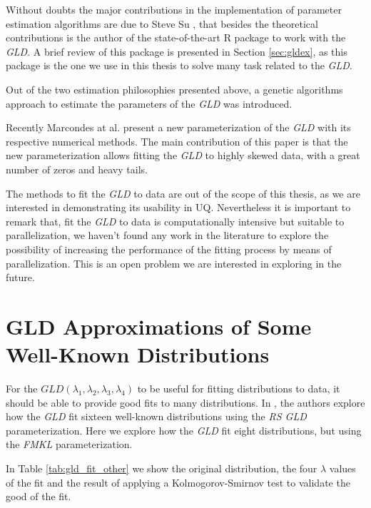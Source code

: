 Without doubts the major contributions in the implementation of parameter estimation algorithms are due to Steve Su \cite{Su2007, Su2011, Su2015, Su2016}, that besides the theoretical contributions is the author of the state-of-the-art R package to work with the \textit{GLD}. A brief review of this package is presented in Section \ref{sec:gldex}, as this package is the one we use in this thesis to solve many task related to the \textit{GLD}.

Out of the two estimation philosophies presented above, \cite{Corlu2016} a genetic algorithms approach to estimate the parameters of the \textit{GLD} was introduced. 

Recently Marcondes at al. \cite{Marcondes2018} present a new parameterization of the \textit{GLD} with its respective numerical methods. The main contribution of this paper is that the new parameterization allows fitting the \textit{GLD} to highly skewed data, with a great number of zeros and heavy tails.

The methods to fit the \textit{GLD} to data are out of the scope of this thesis, as we are interested in demonstrating its usability in UQ. Nevertheless it is important to remark that, fit the \textit{GLD} to data is computationally intensive but suitable to parallelization, we haven't found any work in the literature to explore the possibility of increasing the performance of the fitting process by means of parallelization. This is an open problem we are interested in exploring in the future.    

\section{GLD Approximations of Some Well-Known Distributions}\label{sec:gld_fit_other}
For the $GLD(\lambda_{1}, \lambda_{2}, \lambda_{3}, \lambda_{4})$ to be useful for fitting distributions to data, it should be able to provide good fits to many distributions. In \cite{Karian2011}, the authors explore how the \textit{GLD} fit sixteen well-known distributions using the \textit{RS GLD} parameterization. Here we explore how the \textit{GLD} fit eight distributions, but using the \textit{FMKL} parameterization.

In Table \ref{tab:gld_fit_other} we show the original distribution, the four $\lambda$ values of the fit and the result of applying a Kolmogorov-Smirnov test to validate the good of the fit.

